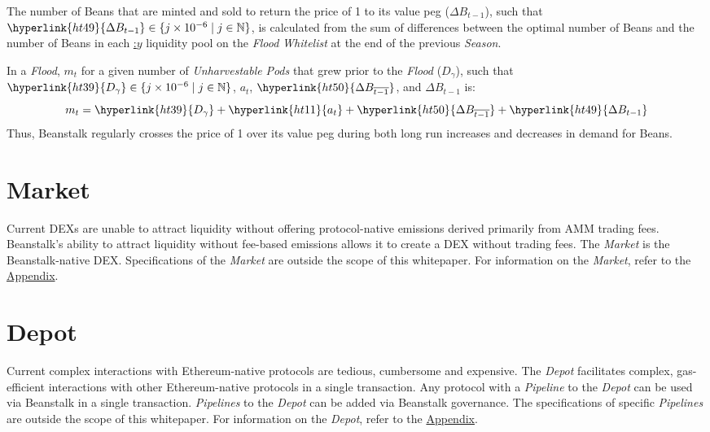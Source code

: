 \documentclass[tikz]{article}
\newcommand{\term}[1]{\textsl{#1}}
\newcommand{\Bean}{} %
\begin{document}
\newpage

The number of Beans that are minted and sold to return the price of \Bean1 to its value peg (\hyperlink{ht49}{$\Delta B_{t-1}$}), such that $\hyperlink{ht49}{\Delta B_{t-1}} \in \{j \times 10^{-6} \mid j \in \mathbb{N} \}$, is calculated from the sum of differences between the optimal number of Beans and the number of Beans in each \hyperlink{ht6}{\Bean:$y$} liquidity pool on the \term{Flood} \term{Whitelist} at the end of the previous \term{Season}.

In a \term{Flood}, $m_t$ for a given number of \term{Unharvestable} \term{Pods} that grew prior to the \term{Flood} (\hyperlink{ht39}{$D_{\gamma}$}), such that $\hyperlink{ht39}{D_{\gamma}} \in \{j \times 10^{-6} \mid j \in \mathbb{N} \}$, \hyperlink{ht11}{$a_t$}, $\hyperlink{ht50}{\Delta B_{\overline{t-1}}}$, and \hyperlink{ht49}{$\Delta B_{t-1}$} is:
$$m_t = \hyperlink{ht39}{D_{\gamma}} + \hyperlink{ht11}{a_t} + \hyperlink{ht50}{\Delta B_{\overline{t-1}}} + \hyperlink{ht49}{\Delta B_{t-1}}$$
Thus, Beanstalk regularly crosses the price of \Bean1 over its value peg during both long run increases and decreases in demand for Beans.

\vspace*{-1.3mm}
\section{Market}
\vspace*{-1.3mm}

Current DEXs are unable to attract liquidity without offering protocol-native emissions derived primarily from AMM trading fees. Beanstalk's ability to attract liquidity without fee-based emissions allows it to create a DEX without trading fees. The \term{Market} is the Beanstalk-native DEX. Specifications of the \term{Market} are outside the scope of this whitepaper. For information on the \term{Market}, refer to the \hyperlink{section.14}{Appendix}.

\vspace*{-1.3mm}
\section{Depot}
\vspace*{-1.3mm}

Current complex interactions with Ethereum-native protocols are tedious, cumbersome and expensive. The \term{Depot} facilitates complex, gas-efficient interactions with other Ethereum-native protocols in a single transaction. Any protocol with a \term{Pipeline} to the \term{Depot} can be used via Beanstalk in a single transaction. \term{Pipelines} to the \term{Depot} can be added via Beanstalk governance. The specifications of specific \term{Pipelines} are outside the scope of this whitepaper. For information on the \term{Depot}, refer to the \hyperlink{section.14}{Appendix}.
\end{document}
